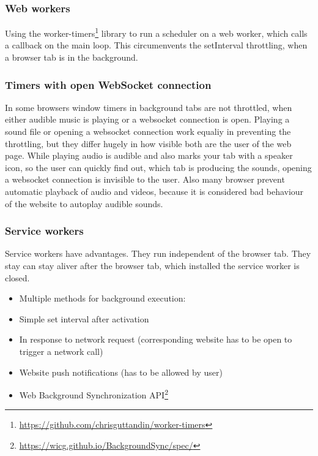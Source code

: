 \documentclass[article,type=bsc,colorback,accentcolor=tud9c]{tudthesis}
\begin{document}
  
  \subsubsection{Web workers}
  
  Using the worker-timers\footnote{\url{https://github.com/chrisguttandin/worker-timers}} library to run a scheduler on a web worker, which calls a callback on the main loop. This circumenvents the setInterval throttling, when a browser tab is in the background.

  \subsubsection{Timers with open WebSocket connection}

  In some browsers window timers in background tabs are not throttled, when either audible music is playing or a websocket connection is open. Playing a sound file or opening a websocket connection work equaliy in preventing the throttling, but they differ hugely in how visible both are the user of the web page. While playing audio is audible and also marks your tab with a speaker icon, so the user can quickly find out, which tab is producing the sounds, opening a websocket connection is invisible to the user. Also many browser prevent automatic playback of audio and videos, because it is considered bad behaviour of the website to autoplay audible sounds.

  
  
  \subsubsection{Service workers}

  Service workers have advantages. They run independent of the browser tab. They stay can stay aliver after the browser tab, which installed the service worker is closed.

  \begin{itemize}   
  \item Multiple methods for background execution:

  \item Simple set interval after activation

  \item In response to network request (corresponding website has to be open to trigger a network call)

  \item Website push notifications (has to be allowed by user)

  \item Web Background Synchronization API\footnote{\url{https://wicg.github.io/BackgroundSync/spec/}}
  \end{itemize}
\end{document}
